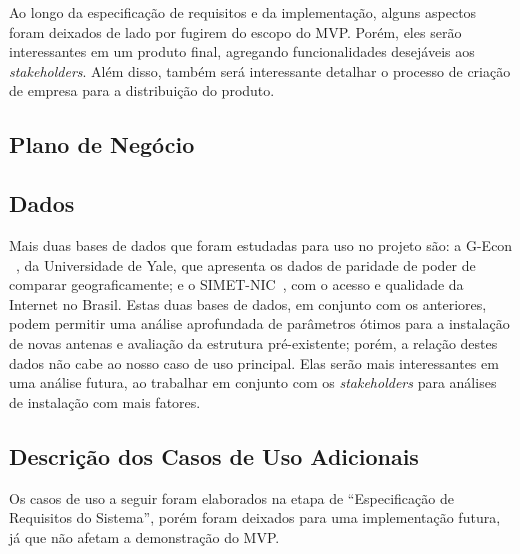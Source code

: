 \documentclass[]{politex}
\begin{document}
Ao longo da especificação de requisitos e da implementação, alguns aspectos
foram deixados de lado por fugirem do escopo do MVP. Porém, eles serão
interessantes em um produto final, agregando funcionalidades desejáveis aos
\textit{stakeholders}. Além disso, também será interessante detalhar o processo de
criação de empresa para a distribuição do produto.

\subsection{Plano de Negócio}


\subsection{Dados}

Mais duas bases de dados que foram estudadas para uso no projeto são: a G-Econ
~\cite{gecon}, da Universidade de Yale, que apresenta os dados de paridade de
poder de comparar geograficamente; e o SIMET-NIC~\cite{simet}, com o acesso e
qualidade da Internet no Brasil. Estas duas bases de dados, em conjunto com os
anteriores, podem permitir uma análise aprofundada de parâmetros ótimos para a
instalação de novas antenas e avaliação da estrutura pré-existente; porém,
a relação destes dados não cabe ao nosso caso de uso principal. Elas serão mais
interessantes em uma análise futura, ao trabalhar em conjunto com os
\textit{stakeholders} para análises de instalação com mais fatores.

\subsection{Descrição dos Casos de Uso Adicionais}

Os casos de uso a seguir foram elaborados na etapa de ``Especificação de
Requisitos do Sistema'', porém foram deixados para uma implementação futura, já
que não afetam a demonstração do MVP.
\end{document}

